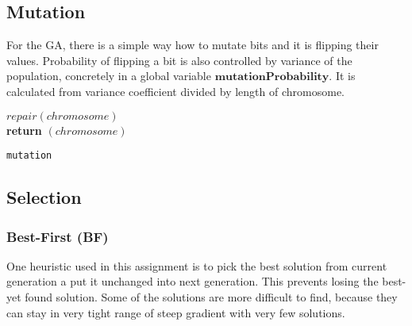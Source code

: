 \documentclass{article}
\begin{document}
	\subsection{Mutation}
		For the GA, there is a simple way how to mutate bits and it is flipping their values. Probability of flipping a bit is also controlled by variance of the population, concretely in a global variable $\textbf{mutationProbability}$. It is calculated from variance coefficient divided by length of chromosome.
		\begin{center}
			\begin{minipage}{1\linewidth} %
				\begin{algorithm}[H]
					\hrulefill
					\medskip

					$repair(chromosome)$\\
					{\bf return} $(chromosome)$
					\caption{\texttt{mutation}} %
					\label{alg:mutation}   %
				\end{algorithm}
			\end{minipage}
		\end{center}
	\subsection{Selection}
		\subsubsection{Best-First (BF)}
		One heuristic used in this assignment is to pick the best solution from current generation a put it unchanged into next generation. This prevents losing the best-yet found solution. Some of the solutions are more difficult to find, because they can stay in very tight range of steep gradient with very few solutions. 
\end{document}
